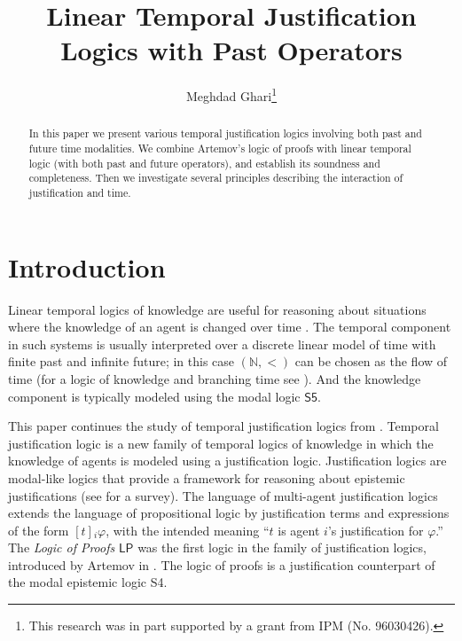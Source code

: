 \documentclass[envcountsect,envcountsame,oribibl,orivec]{llncs}
\newcommand{\SFive}{\textsf{S5}}
\newcommand{\jbox}[1]{\left[#1\right]\!}
\newcommand{\LP}{\textsf{LP}}
\newcommand{\N}{\mathbb{N}}
\renewcommand{\phi}{\varphi}
\begin{document}
\title{Linear Temporal Justification Logics with Past Operators}
\author{Meghdad Ghari\thanks{This research was in part supported by a grant from IPM (No. 96030426).}
}

\maketitle


\begin{abstract}
In this paper we present various temporal justification logics involving both past and future time modalities. We combine Artemov's logic of proofs with linear temporal logic (with both past and future operators), and establish its soundness and completeness. Then we investigate several principles describing the interaction of justification and time.
\end{abstract}



 \section{Introduction}
 \label{sec:Introduction}

Linear temporal logics of knowledge are useful for reasoning about situations where the knowledge of an agent  is changed over time \cite{FHMV95,HvdMV04,HZ92}. The temporal component in such systems is usually  interpreted over a discrete linear model of time with finite past and infinite future; in this case $(\N,<)$ can be chosen as the flow of time (for a logic of knowledge and branching time see \cite{vdMW03}). And the knowledge component is typically modeled using the modal logic $\SFive$.

This paper continues the study of temporal justification logics from \cite{Bucheli15,BucheliGhariStuder2017}. Temporal justification logic is a new family of temporal logics of knowledge in which the knowledge of agents is modeled using a justification logic. Justification logics are modal-like logics that provide a framework for reasoning about epistemic justifications (see \cite{Art08RSL,ArtFit11SEP} for a survey). The language of multi-agent justification logics extends the language of propositional logic by justification terms and expressions of the form $\jbox{t}_i \phi$, with the intended meaning ``$t$   is agent $i$'s justification for $\phi$.''  The \emph{Logic of Proofs} $\LP$ was the first logic in the family of justification logics, introduced by  Artemov in \cite{Art95TR,Art01BSL}. The logic of proofs is a justification counterpart of the modal epistemic logic {\sf S4}.
\end{document}
